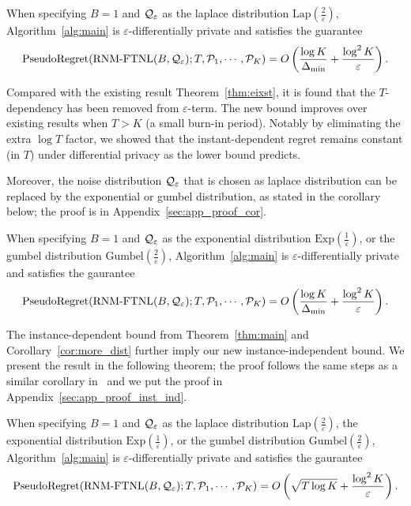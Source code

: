 \begin{theorem}
\label{thm:main}
	When specifying $B=1$ and $\mathcal{Q}_{\varepsilon}$ as the laplace distribution $\mathrm{Lap}(\frac{2}{\varepsilon})$, Algorithm~\ref{alg:main} is $\varepsilon$-differentially private and satisfies the guarantee
	\begin{equation}
		\label{eq:regret_main}
	\mathrm{PseudoRegret}(\text{RNM-FTNL}(B, \mathcal{Q}_{\varepsilon}); T, \mathcal{P}_1, \cdots, \mathcal{P}_K) = O\left(\frac{\log K}{\Delta_{\min}} + \frac{\log^2K}{\varepsilon}\right).
	\end{equation}
\end{theorem}
Compared with the existing result Theorem~\ref{thm:eixst}, it is found that the $T$-dependency has been removed from $\varepsilon$-term.
The new bound improves over existing results when $T>K$ (a small burn-in period). Notably by eliminating the extra $\log T$ factor, we showed that the instant-dependent regret remains constant (in $T$) under differential privacy as the lower bound predicts.

Moreover, the noise distribution $\mathcal{Q}_{\varepsilon}$ that is chosen as laplace distribution can be replaced by the exponential or gumbel distribution, as stated in the corollary below; the proof is in Appendix~\ref{sec:app_proof_cor}.
\begin{corollary}
\label{cor:more_dist}
	When specifying $B=1$ and $\mathcal{Q}_{\varepsilon}$ as the exponential distribution $\mathrm{Exp}(\frac{1}{\varepsilon})$, or the gumbel distribution $\mathrm{Gumbel}(\frac{2}{\varepsilon})$, Algorithm~\ref{alg:main} is $\varepsilon$-differentially private and satisfies the gaurantee
	$$
	\mathrm{PseudoRegret}(\text{RNM-FTNL}(B, \mathcal{Q}_{\varepsilon}); T, \mathcal{P}_1, \cdots, \mathcal{P}_K) = O\left(\frac{\log K}{\Delta_{\min}} + \frac{\log^2 K}{\varepsilon}\right).
	$$
\end{corollary}

The instance-dependent bound from Theorem~\ref{thm:main} and Corollary~\ref{cor:more_dist} further imply our new instance-independent bound.
We present the result in the following theorem; the proof follows the same steps as a similar corollary in~\citet{hu2021near} and we put the proof in Appendix~\ref{sec:app_proof_inst_ind}.
\begin{corollary}
\label{cor:inst_ind}
	When specifying $B=1$ and $\mathcal{Q}_{\varepsilon}$ as the laplace distribution $\mathrm{Lap}(\frac{2}{\varepsilon})$, the exponential distribution $\mathrm{Exp}(\frac{1}{\varepsilon})$, or the gumbel distribution $\mathrm{Gumbel}(\frac{2}{\varepsilon})$, Algorithm~\ref{alg:main} is $\varepsilon$-differentially private and satisfies the gaurantee
	$$
	\mathrm{PseudoRegret}(\text{RNM-FTNL}(B, \mathcal{Q}_{\varepsilon}); T, \mathcal{P}_1, \cdots, \mathcal{P}_K) = O\left(\sqrt{T\log K} + \frac{\log^2 K}{\varepsilon}\right).
	$$
\end{corollary}

